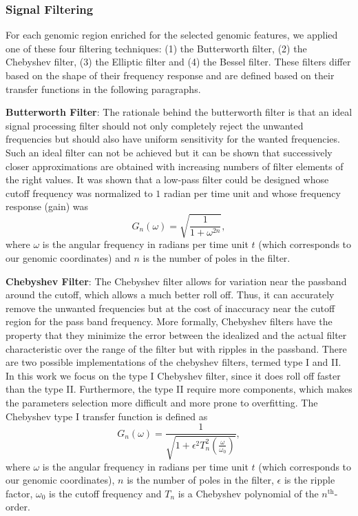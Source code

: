 \subsubsection{Signal Filtering}
\label{sec:signal.filtering}

For each genomic region enriched for the selected genomic features, we applied one of these four filtering techniques: (1) the Butterworth filter, (2) the Chebyshev filter, (3) the Elliptic filter and (4) the Bessel filter. These filters differ based on the shape of their frequency response and are defined based on their transfer functions in the following paragraphs.

\textbf{Butterworth Filter}: The rationale behind the butterworth filter is that an ideal signal processing filter should not only completely reject the unwanted frequencies but should also have uniform sensitivity for the wanted frequencies. Such an ideal filter can not be achieved but it can be shown that successively closer approximations are obtained with increasing numbers of filter elements of the right values. It was shown that a low-pass filter could be designed whose cutoff frequency was normalized to $1$ radian per time unit and whose frequency response (gain) was
\begin{equation}
  \label{eq:butterworth1}
  G_n(\omega) = \sqrt{\frac{1}{{1+\omega^{2n}}}},
\end{equation}
where $ \omega $ is the angular frequency in radians per time unit $ t $ (which corresponds to our genomic coordinates) and $n$ is the number of poles in the filter.

\textbf{Chebyshev Filter}: The Chebyshev filter allows for variation near the passband around the cutoff, which allows a much better roll off. Thus, it can accurately remove the unwanted frequencies but at the cost of inaccuracy near the cutoff region for the pass band frequency. More formally, Chebyshev filters have the property that they minimize the error between the idealized and the actual filter characteristic over the range of the filter but with ripples in the passband. There are two possible implementations of the chebyshev filters, termed type I and II. In this work we focus on the type I Chebyshev filter, since it does roll off faster than the type II. Furthermore, the type II require more components, which makes the parameters selection more difficult and more prone to overfitting. The Chebyshev type I transfer function is defined as
\begin{equation}
  \label{eq:chebyshev1}
  G_n(\omega) = \frac{1}{\sqrt{1+{\epsilon^2 {T}_{n}^{2} (\frac{\omega}{\omega_0})}}},
\end{equation}
where $ \omega $ is the angular frequency in radians per time unit $ t $ (which corresponds to our genomic coordinates), $n$ is the number of poles in the filter, $ \epsilon $ is the ripple factor, $ \omega_0 $ is the cutoff frequency and $ T_n $ is a Chebyshev polynomial of the $n^{\text{th}}$-order.

